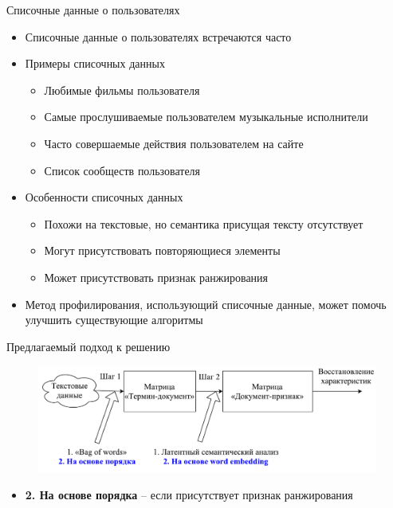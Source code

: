 \documentclass{beamer}
\begin{document}
\begin{frame}{Списочные данные о пользователях}
    \begin{itemize}
        \item {Списочные данные о пользователях встречаются часто}
        \item {Примеры списочных данных}
            \begin{itemize}
                \item {Любимые фильмы пользователя}
                \item {Самые прослушиваемые пользователем музыкальные исполнители}
                \item {Часто совершаемые действия пользователем на сайте}
                \item {Список сообществ пользователя}
            \end{itemize}
        \item {Особенности списочных данных}
            \begin{itemize}
                \item {Похожи на текстовые, но семантика присущая тексту отсутствует}
                \item {Могут присутствовать повторяющиеся элементы}
                \item {Может присутствовать признак ранжирования}
            \end{itemize}
        \item {Метод профилирования, использующий списочные данные,
            может помочь улучшить существующие алгоритмы}
    \end{itemize}
\end{frame}

\begin{frame}{Предлагаемый подход к решению}
    \begin{figure}
        \includegraphics[width=\textwidth]{figures/presentation-concept.pdf}
    \end{figure}
    \begin{itemize}
        \item \textbf{\color{blue} 2. На основе порядка} -- если присутствует признак ранжирования
    \end{itemize}
\end{frame}
\end{document}
